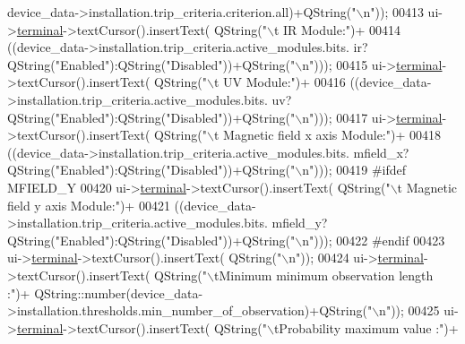 \begin{DoxyCode}
      device\_data->installation.trip\_criteria.criterion.all)+QString(\textcolor{stringliteral}{"\(\backslash\)n"}));
00413        ui->\hyperlink{a00080_aae71c46ea4546df5994735dee573b2dd}{terminal}->textCursor().insertText( QString(\textcolor{stringliteral}{"\(\backslash\)t  IR Module:"})+
00414                                             ((device\_data->installation.trip\_criteria.active\_modules.bits.
      ir?QString(\textcolor{stringliteral}{"Enabled"}):QString(\textcolor{stringliteral}{"Disabled"}))+QString(\textcolor{stringliteral}{"\(\backslash\)n"})));
00415        ui->\hyperlink{a00080_aae71c46ea4546df5994735dee573b2dd}{terminal}->textCursor().insertText( QString(\textcolor{stringliteral}{"\(\backslash\)t  UV Module:"})+
00416                                             ((device\_data->installation.trip\_criteria.active\_modules.bits.
      uv?QString(\textcolor{stringliteral}{"Enabled"}):QString(\textcolor{stringliteral}{"Disabled"}))+QString(\textcolor{stringliteral}{"\(\backslash\)n"})));
00417        ui->\hyperlink{a00080_aae71c46ea4546df5994735dee573b2dd}{terminal}->textCursor().insertText( QString(\textcolor{stringliteral}{"\(\backslash\)t  Magnetic field x axis Module:"})+
00418                                             ((device\_data->installation.trip\_criteria.active\_modules.bits.
      mfield\_x?QString(\textcolor{stringliteral}{"Enabled"}):QString(\textcolor{stringliteral}{"Disabled"}))+QString(\textcolor{stringliteral}{"\(\backslash\)n"})));
00419 \textcolor{preprocessor}{#ifdef MFIELD\_Y}
00420        ui->\hyperlink{a00080_aae71c46ea4546df5994735dee573b2dd}{terminal}->textCursor().insertText( QString(\textcolor{stringliteral}{"\(\backslash\)t  Magnetic field y axis Module:"})+
00421                                             ((device\_data->installation.trip\_criteria.active\_modules.bits.
      mfield\_y?QString(\textcolor{stringliteral}{"Enabled"}):QString(\textcolor{stringliteral}{"Disabled"}))+QString(\textcolor{stringliteral}{"\(\backslash\)n"})));
00422 \textcolor{preprocessor}{#endif}
00423        ui->\hyperlink{a00080_aae71c46ea4546df5994735dee573b2dd}{terminal}->textCursor().insertText( QString(\textcolor{stringliteral}{"\(\backslash\)n"}));
00424        ui->\hyperlink{a00080_aae71c46ea4546df5994735dee573b2dd}{terminal}->textCursor().insertText( QString(\textcolor{stringliteral}{"\(\backslash\)tMinimum minimum observation length :"})+
      QString::number(device\_data->installation.thresholds.min\_number\_of\_observation)+QString(\textcolor{stringliteral}{"\(\backslash\)n"}));
00425        ui->\hyperlink{a00080_aae71c46ea4546df5994735dee573b2dd}{terminal}->textCursor().insertText( QString(\textcolor{stringliteral}{"\(\backslash\)tProbability maximum value :"})+

\end{DoxyCode}

